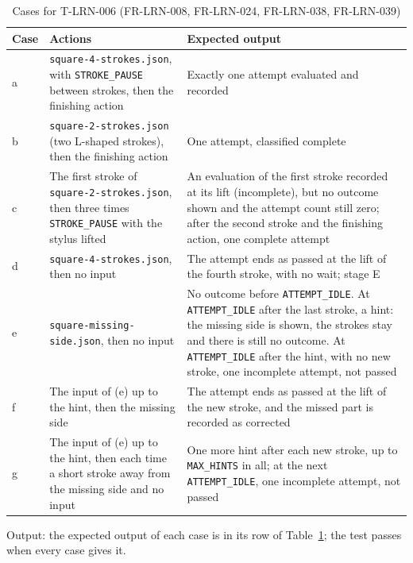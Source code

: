 \documentclass[12pt, titlepage]{article}
\begin{document}
\begin{enumerate}
\begin{table}[htbp]
\centering\small
\caption{Cases for T-LRN-006 (FR-LRN-008, FR-LRN-024, FR-LRN-038,
FR-LRN-039)}
\label{tab:t-lrn-006}
\begin{tabularx}{\textwidth}{@{}l >{\raggedright\arraybackslash}X
  >{\raggedright\arraybackslash}X@{}}
\toprule
\textbf{Case} & \textbf{Actions} & \textbf{Expected output}\\
\midrule
a & \texttt{square-\allowbreak{}4-\allowbreak{}strokes.json}, with
\texttt{STROKE\_PAUSE} between strokes, then the finishing action & Exactly
one attempt evaluated and recorded\\
b & \texttt{square-\allowbreak{}2-\allowbreak{}strokes.json} (two L-shaped
strokes), then the finishing action & One attempt, classified complete\\
c & The first stroke of
\texttt{square-\allowbreak{}2-\allowbreak{}strokes.json}, then three times
\texttt{STROKE\_PAUSE} with the stylus lifted & An evaluation of the first
stroke recorded at its lift (incomplete), but no outcome shown and the attempt
count still zero; after the second stroke and the finishing action,
one complete attempt\\
d & \texttt{square-\allowbreak{}4-\allowbreak{}strokes.json}, then no input
& The attempt ends as passed at the lift of the fourth stroke, with no
wait; stage E\\
e & \texttt{square-\allowbreak{}missing-\allowbreak{}side.json}, then no
input & No outcome before \texttt{ATTEMPT\_IDLE}. At \texttt{ATTEMPT\_IDLE}
after the last stroke, a hint: the missing side is shown, the strokes stay and
there is still no outcome. At \texttt{ATTEMPT\_IDLE} after the hint, with no
new stroke, one incomplete attempt, not passed\\
f & The input of (e) up to the hint, then the missing side & The attempt
ends as passed at the lift of the new stroke, and the missed part is recorded
as corrected\\
g & The input of (e) up to the hint, then each time a short stroke away from
the missing side and no input & One more hint after each new stroke, up to
\texttt{MAX\_HINTS} in all; at the next \texttt{ATTEMPT\_IDLE}, one incomplete
attempt, not passed\\
\bottomrule
\end{tabularx}
\end{table}

Output: the expected output of each case is in its row of
Table~\ref{tab:t-lrn-006}; the test passes when every case gives it.


\end{enumerate}
\end{document}
